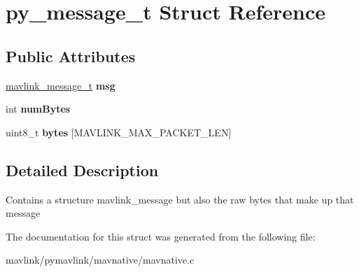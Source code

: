 \hypertarget{structpy__message__t}{}\section{py\+\_\+message\+\_\+t Struct Reference}
\label{structpy__message__t}
\subsection*{Public Attributes}
\begin{DoxyCompactItemize}
\item 
\mbox{\label{structpy__message__t_ad25d53a85d0e174aa674ecaaad2d82e6}} 
\hyperlink{struct____mavlink__message}{mavlink\+\_\+message\+\_\+t} {\bfseries msg}
\item 
\mbox{\label{structpy__message__t_a524ff7982e9326e6a1560f93b9aa325d}} 
int {\bfseries num\+Bytes}
\item 
\mbox{\label{structpy__message__t_ae580fbe98beb54e856e0a7b32e4deb5b}} 
uint8\+\_\+t {\bfseries bytes} \mbox{[}M\+A\+V\+L\+I\+N\+K\+\_\+\+M\+A\+X\+\_\+\+P\+A\+C\+K\+E\+T\+\_\+\+L\+EN\mbox{]}
\end{DoxyCompactItemize}


\subsection{Detailed Description}
Contains a structure mavlink\+\_\+message but also the raw bytes that make up that message 

The documentation for this struct was generated from the following file\+:\begin{DoxyCompactItemize}
\item 
mavlink/pymavlink/mavnative/mavnative.\+c\end{DoxyCompactItemize}
